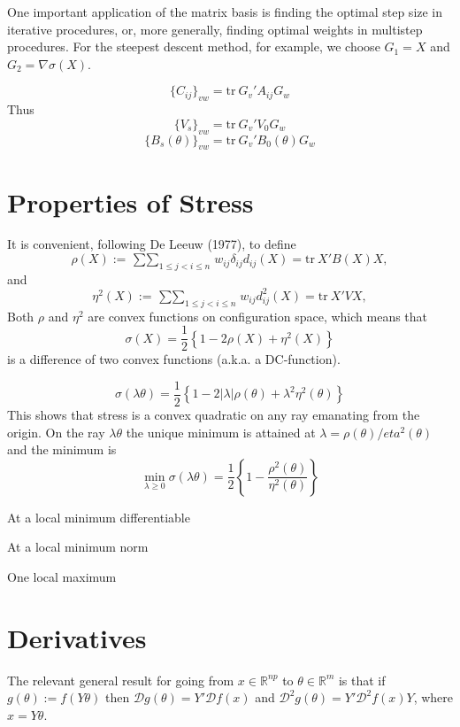 \documentclass[
  12pt,
]{article}
\newcommand{\jis}{\mathop{\sum\sum}_{1\leq j<i\leq n}}
\begin{document}
One important application of the matrix basis is finding the optimal step size in
iterative procedures, or, more generally, finding optimal weights in multistep
procedures. For the steepest descent method, for example, we choose \(G_1=X\)
and \(G_2=\nabla\sigma(X)\).

\[
\{C_{ij}\}_{vw}=\text{tr}\ G_v'A_{ij}G_w
\]
Thus
\[
\{V_s\}_{vw}=\text{tr}\ G_v'V_0G_w
\]
\[
\{B_s(\theta)\}_{vw}=\text{tr}\ G_v'B_0(\theta)G_w
\]

\section{Properties of Stress}\label{properties-of-stress}

It is convenient, following De Leeuw (1977), to define
\begin{equation}
\rho(X):=\jis w_{ij}\delta_{ij}d_{ij}(X)=\text{tr}\ X'B(X)X,
\label{eq:rhodefconf}
\end{equation}
and
\begin{equation}
\eta^2(X):=\jis w_{ij}d_{ij}^2(X)=\text{tr}\ X'VX,
\label{eq:eta2defconf}
\end{equation}
Both \(\rho\) and \(\eta^2\) are convex functions on configuration space, which means that
\begin{equation}
\sigma(X)=\frac12\left\{1-2\rho(X)+\eta^2(X)\right\}
\label{eq:sdcdef}
\end{equation}
is a difference of two convex functions (a.k.a. a DC-function).

\[
\sigma(\lambda\theta)=\frac12\left\{1-2|\lambda|\rho(\theta)+\lambda^2\eta^2(\theta)\right\}
\]
This shows that stress is a convex quadratic on any ray emanating from the origin. On the ray \(\lambda\theta\) the unique minimum is attained at \(\lambda=\rho(\theta)/eta^2(\theta)\)
and the minimum is
\[
\min_{\lambda\geq 0}\sigma(\lambda\theta)=\frac12\left\{1-\frac{\rho^2(\theta)}{\eta^2(\theta)}\right\}
\]

At a local minimum differentiable

At a local minimum norm

One local maximum

\section{Derivatives}\label{derivatives}

The relevant general result for going from \(x\in\mathbb{R}^{np}\) to \(\theta\in\mathbb{R}^m\) is that if \(g(\theta):=f(Y\theta)\) then \(\mathcal{D}g(\theta)=Y'\mathcal{D}f(x)\) and \(\mathcal{D}^2g(\theta)=Y'\mathcal{D}^2f(x)Y\), where \(x=Y\theta\).
\end{document}
